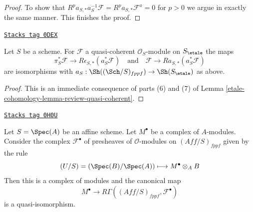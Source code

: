 \begin{proof}
\medskip\noindent
To show that $R^pa_{S, *}a_S^{-1}\mathcal{F} = R^pa_{S, *}\mathcal{F}^a = 0$
for $p > 0$ we argue in exactly the same manner. This finishes the proof.
\end{proof}

\begin{lemma}
\label{etale-cohomology-lemma-cohomological-descent-etale-fppf-modules}
\href{https://stacks.math.columbia.edu/tag/0DEX}{\texttt{Stacks tag 0DEX}}

Let $S$ be a scheme. For $\mathcal{F}$ a quasi-coherent
$\mathcal{O}_S$-module on $S_\etale$ the maps
$$
\pi_S^*\mathcal{F} \longrightarrow R\epsilon_{S, *}(a_S^*\mathcal{F})
\quad\text{and}\quad
\mathcal{F} \longrightarrow Ra_{S, *}(a_S^*\mathcal{F})
$$
are isomorphisms with
$a_S : \Sh((\Sch/S)_{fppf}) \to \Sh(S_\etale)$ as above.
\end{lemma}

\begin{proof}
This is an immediate consequence of
parts (6) and (7) of
Lemma \ref{etale-cohomology-lemma-review-quasi-coherent}.
\end{proof}

\begin{lemma}
\label{etale-cohomology-lemma-cohomological-descent-complex-modules}
\href{https://stacks.math.columbia.edu/tag/0H0U}{\texttt{Stacks tag 0H0U}}

Let $S = \Spec(A)$ be an affine scheme. Let $M^\bullet$ be a complex
of $A$-modules. Consider the complex $\mathcal{F}^\bullet$ of
presheaves of $\mathcal{O}$-modules on
$(\textit{Aff}/S)_{fppf}$ given by the rule
$$
(U/S) = (\Spec(B)/\Spec(A)) \longmapsto M^\bullet \otimes_A B
$$
Then this is a complex of modules and the canonical map
$$
M^\bullet \longrightarrow
R\Gamma((\textit{Aff}/S)_{fppf}, \mathcal{F}^\bullet)
$$
is a quasi-isomorphism.
\end{lemma}

